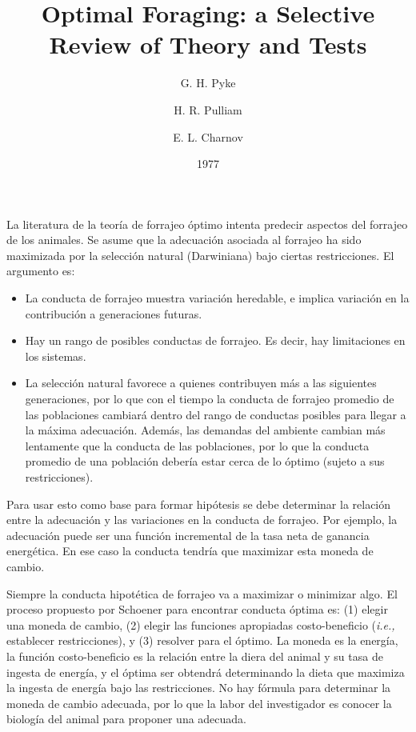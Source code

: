 \documentclass[a4paper,12pt]{article}
\title{Optimal Foraging: a Selective Review of Theory and Tests}
\author{G. H. Pyke \and H. R. Pulliam \and E. L. Charnov}
\date{1977}
\begin{document}
{\scshape\bfseries \maketitle}

La literatura de la teoría de forrajeo óptimo intenta predecir aspectos del forrajeo de los animales. Se asume que la adecuación asociada al forrajeo ha sido maximizada por la selección natural (Darwiniana) bajo ciertas restricciones. El argumento es:

\begin{itemize}
	\item La conducta de forrajeo muestra variación heredable, e implica variación en la contribución a generaciones futuras.
	\item Hay un rango de posibles conductas de forrajeo. Es decir, hay limitaciones en los sistemas.
	\item La selección natural favorece a quienes contribuyen más a las siguientes generaciones, por lo que con el tiempo la conducta de forrajeo promedio de las poblaciones cambiará dentro del rango de conductas posibles para llegar a la máxima adecuación. Además, las demandas del ambiente cambian más lentamente que la conducta de las poblaciones, por lo que la conducta promedio de una población debería estar cerca de lo óptimo (sujeto a sus restricciones).
\end{itemize}

Para usar esto como base para formar hipótesis se debe determinar la relación entre la adecuación y las variaciones en la conducta de forrajeo. Por ejemplo, la adecuación puede ser una función incremental de la tasa neta de ganancia energética. En ese caso la conducta tendría que maximizar esta moneda de cambio.

Siempre la conducta hipotética de forrajeo va a maximizar o minimizar algo. El proceso propuesto por Schoener para encontrar conducta óptima es: (1) elegir una moneda de cambio, (2) elegir las funciones apropiadas costo-beneficio ({\itshape i.e.,} establecer restricciones), y (3) resolver para el óptimo. La moneda es la energía, la función costo-beneficio es la relación entre la diera del animal y su tasa de ingesta de energía, y el óptima ser obtendrá determinando la dieta que maximiza la ingesta de energía bajo las restricciones. No hay fórmula para determinar la moneda de cambio adecuada, por lo que la labor del investigador es conocer la biología del animal para proponer una adecuada.
\end{document}
